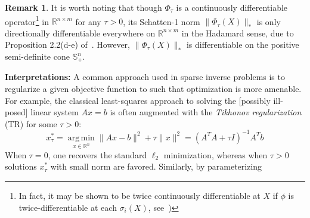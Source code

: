 \documentclass[10pt]{article}
\numberwithin{equation}{section}
\newcommand{\+}{%
	\raisebox{0.18ex}{\scaleobj{0.55}{+}}
}
\DeclareMathOperator*{\argmin}{arg\,min}
\theoremstyle{definition}
\newtheorem{remark}{Remark}
\theoremstyle{definition}
\begin{document}
\begin{remark} 
	It is worth noting that though $\Phi_\tau$ is a continuously differentiable operator\footnote{In fact, it may be shown to be twice continuously differentiable at $X$ if $\phi$ is twice-differentiable at each $\sigma_i(X)$, see~\cite{ding2018spectral})} in $\mathbb{R}^{n \times m}$ for any $\tau > 0$, %
its Schatten-1 norm $\lVert\Phi_\tau(X)\rVert_\ast$ is only directionally differentiable everywhere on $\mathbb{R}^{n \times m}$ in the Hadamard sense, due to Proposition 2.2(d-e)  of~\cite{bi2013approximation}. However, $\lVert\Phi_\tau(X)\rVert_\ast$ is differentiable on the positive semi-definite cone $\mathbb{S}^n_+$.
\end{remark}
\noindent
\textbf{Interpretations:} A common approach used in sparse inverse problems is to regularize a given objective function to such that optimization is more amenable. 
For example, the classical least-squares approach to solving the [possibly ill-posed] linear system $A x = b$ is often augmented with the \emph{Tikhonov regularization} (TR) for some $\tau > 0$:
 \begin{equation}\label{eq:tikhonov}
	x_\tau^\ast = \argmin\limits_{x \in \mathbb{R}^n} \lVert Ax - b\rVert^2 + \tau \lVert x \rVert^2 = (A^T A + \tau I)^{-1} A^T b
\end{equation}
When $\tau = 0$, one recovers the standard $\ell_2$ minimization, whereas when $\tau > 0$ solutions $x_\tau^\ast$ with small norm are favored. 
Similarly, by parameterizing
\end{document}
